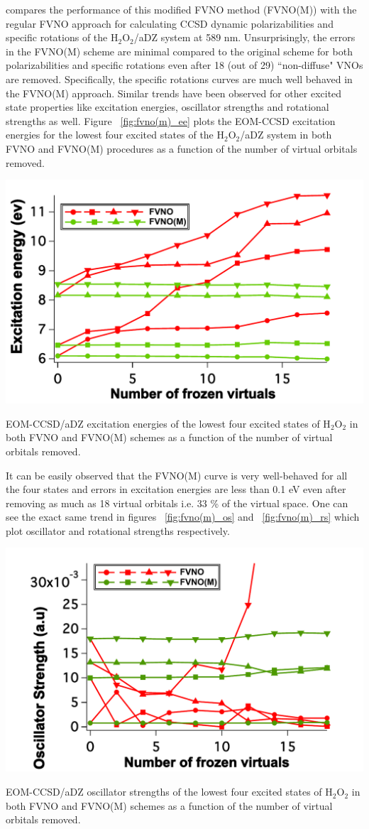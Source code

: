 compares the performance of this modified FVNO method (FVNO(M)) with the regular 
FVNO approach for calculating CCSD dynamic polarizabilities and specific rotations 
of the H$_2$O$_2$/aDZ system at 589 nm. Unsurprisingly, the errors in the FVNO(M) 
scheme are minimal compared to the original scheme for both polarizabilities and 
specific rotations even after 18 (out of 29) ``non-diffuse" VNOs are removed.
Specifically, the specific rotations curves are much well behaved in the 
FVNO(M) approach. Similar trends have been observed for other excited state
properties like excitation energies, oscillator strengths and rotational 
strengths as well. Figure ~\ref{fig:fvno(m)_ee} plots the EOM-CCSD 
excitation energies for the lowest four excited states of the H$_2$O$_2$/aDZ system
in both FVNO and FVNO(M) procedures as a function of the number of virtual orbitals removed.
\begin{MyFigure}[h!]
\centering
\includegraphics[width=0.6\linewidth]{figures_fvno++/fvno(m)_h2o2_adz_ee.pdf}
\caption{{\footnotesize EOM-CCSD/aDZ excitation energies of the lowest four excited states of H$_2$O$_2$ in both FVNO and FVNO(M) schemes as a function of the number of virtual orbitals removed.}}
\label{fig:fvno(m)_ee}
\end{MyFigure}
It can be easily observed that the FVNO(M) curve is very well-behaved for 
all the four states and errors in excitation energies are less than 0.1 eV
even after removing as much as 18 virtual orbitals i.e. 33 \% of the virtual
space. One can see the exact same trend in figures ~\ref{fig:fvno(m)_os} and 
~\ref{fig:fvno(m)_rs} which plot oscillator and rotational strengths respectively.
\begin{MyFigure}[h!]
\centering
\includegraphics[width=0.6\linewidth]{figures_fvno++/fvno(m)_h2o2_adz_os.pdf}
\caption{{\footnotesize EOM-CCSD/aDZ oscillator strengths of the lowest four excited states of H$_2$O$_2$ in both FVNO and FVNO(M) schemes as a function of the number of virtual orbitals removed.}}
\label{fig:fvno(m)_os}
\end{MyFigure}
